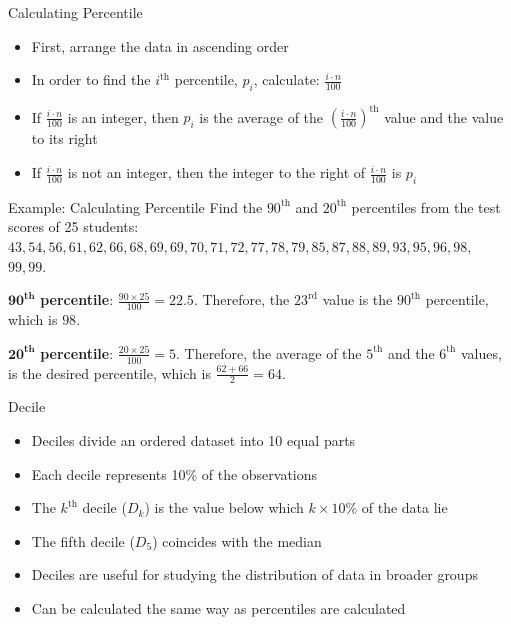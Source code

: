 \documentclass[12pt, aspectratio=169]{beamer}
\begin{document}
    \begin{frame}{Calculating Percentile}
        \begin{itemize}
                \item First, arrange the data in ascending order
                \item In order to find the $i^{\text{th}}$ percentile, $p_i$, calculate: $\frac{i \cdot n}{100}$
                \item If $\frac{i \cdot n}{100}$ is an integer, then $p_i$ is the average of the $\left(\frac{i \cdot n}{100}\right)^{\text{th}}$ value and the value to its right
                \item If $\frac{i \cdot n}{100}$ is not an integer, then the integer to the right of $\frac{i \cdot n}{100}$ is $p_i$
        \end{itemize}
    \end{frame}


    \begin{frame}{Example: Calculating Percentile}
        Find the $90^{\text{th}}$ and $20^{\text{th}}$ percentiles from the test scores of 25 students: $43, 54, 56, 61, 62, 66, 68, 69, 69, 70, 71, 72, 77, 78, 79, 85, 87, 88, 89, 93, 95, 96, 98,$\\ $99, 99$.
        \vspace{1em}

        $\mathbf{90}^{\textbf{th}}$ \textbf{percentile}: $\frac{90 \times 25}{100} = 22.5$. Therefore, the $23^{\text{rd}}$ value is the $90^{\text{th}}$ percentile, which is $98$.
        \vspace{1em}

        $\mathbf{20}^{\textbf{th}}$ \textbf{percentile}: $\frac{20 \times 25}{100} = 5$. Therefore, the average of the $5^{\text{th}}$ and the $6^{\text{th}}$ values, is the desired percentile, which is $\frac{62+66}{2}=64$.
    \end{frame}


    \begin{frame}{Decile}
        \begin{itemize}
            \item Deciles divide an ordered dataset into 10 equal parts
            \item Each decile represents 10\% of the observations
            \item The $k^{\text{th}}$ decile ($D_k$) is the value below which $k \times 10\%$ of the data lie
            \item The fifth decile ($D_5$) coincides with the median
            \item Deciles are useful for studying the distribution of data in broader groups
            \item Can be calculated the same way as percentiles are calculated
        \end{itemize}
    \end{frame}
\end{document}
